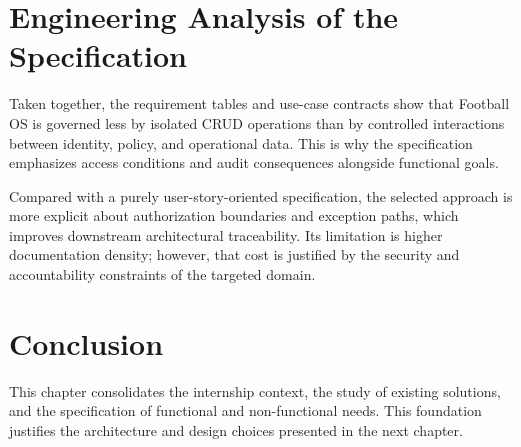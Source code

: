 \section{Engineering Analysis of the Specification}

Taken together, the requirement tables and use-case contracts show that Football
OS is governed less by isolated CRUD operations than by controlled interactions
between identity, policy, and operational data. This is why the specification
emphasizes access conditions and audit consequences alongside functional goals.

Compared with a purely user-story-oriented specification, the selected approach
is more explicit about authorization boundaries and exception paths, which
improves downstream architectural traceability. Its limitation is higher
documentation density; however, that cost is justified by the security and
accountability constraints of the targeted domain.

\section*{Conclusion}

This chapter consolidates the internship context, the study of existing
solutions, and the specification of functional and non-functional needs. This
foundation justifies the architecture and design choices presented in the next
chapter.

